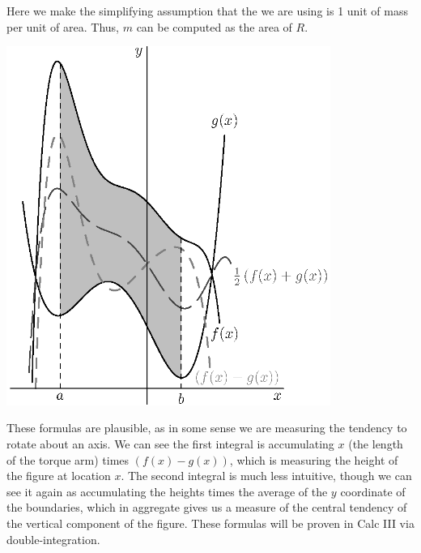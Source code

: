 Here we make the simplifying assumption that the  we are using is 1 unit of mass per unit of area.  Thus, $m$ can be computed as the area of $R$.

	\begin{center}
		\includegraphics[width=300pt]{ChapterGeom/Figures/centmass.eps}
	\end{center}

These formulas are plausible, as in some sense we are measuring the tendency to rotate about an axis.  We can see the first integral is accumulating $x$ (the length of the torque arm) times $(f(x)-g(x))$, which is measuring the height of the figure at location $x$.  The second integral is much less intuitive, though we can see it again as accumulating the heights times the average of the $y$ coordinate of the boundaries, which in aggregate gives us a measure of the central tendency of the vertical component of the figure.  These formulas will be proven in Calc III via double-integration.

